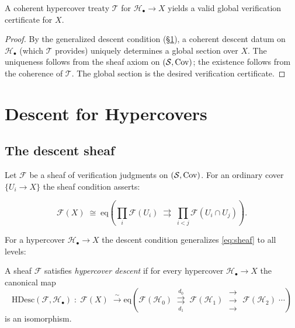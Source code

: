 \documentclass[11pt]{article}
\newcommand{\HC}{\mathcal{H}}              %
\newcommand{\Treaty}{\mathcal{T}}          %
\newcommand{\face}[1]{d_{#1}}             %
\newcommand{\HypDescent}{\mathrm{HDesc}}  %
\begin{document}
\begin{proposition}\label{prop:treaty-sound}
  A coherent hypercover treaty $\Treaty$ for $\HC_\bullet \to X$
  yields a valid global verification certificate for $X$.
\end{proposition}

\begin{proof}
  By the generalized descent condition (\S\ref{sec:descent}),
  a coherent descent datum on $\HC_\bullet$ (which $\Treaty$ provides)
  uniquely determines a global section over $X$.  The uniqueness
  follows from the sheaf axiom on $(\mathcal{S}, \mathrm{Cov})$; the existence
  follows from the coherence of $\Treaty$.  The global section is the
  desired verification certificate.
\end{proof}

\section{Descent for Hypercovers}\label{sec:descent}

\subsection{The descent sheaf}

Let $\mathcal{F}$ be a sheaf of verification judgments on $(\mathcal{S}, \mathrm{Cov})$.
For an ordinary cover $\{U_i \to X\}$ the sheaf condition asserts:

\begin{equation}\label{eq:sheaf}
  \mathcal{F}(X) \;\cong\;
  \mathrm{eq}\!\left(
    \prod_i \mathcal{F}(U_i)
    \;\rightrightarrows\;
    \prod_{i < j} \mathcal{F}(U_i \cap U_j)
  \right).
\end{equation}

For a hypercover $\HC_\bullet \to X$ the descent condition generalizes
\eqref{eq:sheaf} to all levels:

\begin{definition}\label{def:hcdescent}
  A sheaf $\mathcal{F}$ satisfies \emph{hypercover descent} if for
  every hypercover $\HC_\bullet \to X$ the canonical map
  \[
    \HypDescent(\mathcal{F}, \HC_\bullet)\;:\;
    \mathcal{F}(X) \;\xrightarrow{\;\sim\;}
    \mathrm{eq}\!\left(
      \mathcal{F}(\HC_0)
      \;\underset{\face{1}}{\overset{\face{0}}{\rightrightarrows}}\;
      \mathcal{F}(\HC_1)
      \;\substack{\longrightarrow\\[-0.4ex]\longrightarrow\\[-0.4ex]
                  \longrightarrow}\;
      \mathcal{F}(\HC_2)
      \;\cdots
    \right)
  \]
  is an isomorphism.
\end{definition}
\end{document}
